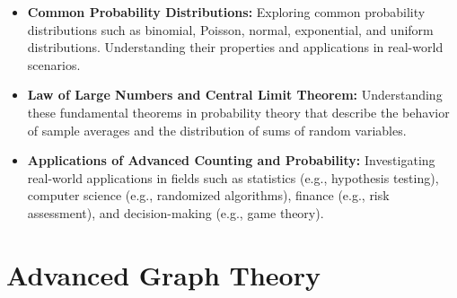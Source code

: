 \documentclass[openany]{book}
\begin{document}
\begin{itemize}
    \item \textbf{Common Probability Distributions:} Exploring common probability distributions such as binomial, Poisson, normal, exponential, and uniform distributions. Understanding their properties and applications in real-world scenarios.
    \item \textbf{Law of Large Numbers and Central Limit Theorem:} Understanding these fundamental theorems in probability theory that describe the behavior of sample averages and the distribution of sums of random variables.
    \item \textbf{Applications of Advanced Counting and Probability:} Investigating real-world applications in fields such as statistics (e.g., hypothesis testing), computer science (e.g., randomized algorithms), finance (e.g., risk assessment), and decision-making (e.g., game theory).
\end{itemize}
\section{Advanced Graph Theory}
\end{document}
